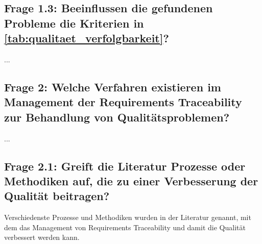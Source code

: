 

\subsection{Frage 1.3: Beeinflussen die gefundenen Probleme die Kriterien in \ref{tab:qualitaet_verfolgbarkeit}?}


...

\subsection{Frage 2: Welche Verfahren existieren im Management der Requirements Traceability zur Behandlung von Qualitätsproblemen?}
...

\subsection{Frage 2.1: Greift die Literatur Prozesse oder Methodiken auf, die zu einer Verbesserung der Qualität beitragen?}

Verschiedenste Prozesse und Methodiken wurden in der Literatur genannt, mit dem das Management von Requirements Traceability und damit die Qualität verbessert werden kann. 

